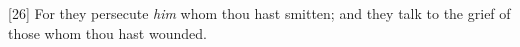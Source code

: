 [26] \textcolor[cmyk]{0.99998,1,0,0}{For they persecute \emph{him} whom thou hast smitten; and they talk to the grief of those whom thou hast wounded.} %
